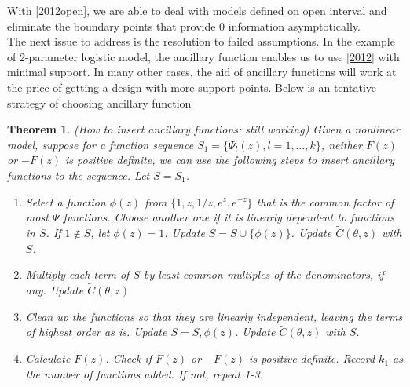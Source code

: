 \documentclass[11pt]{amsart}
\newtheorem{theorem}{Theorem}[section]
\theoremstyle{definition}
\theoremstyle{remark}
\begin{document}
With \ref{2012open}, we are able to deal with models defined on open interval and eliminate the boundary points that provide 0 information asymptotically. \\

The next issue to address is the resolution to failed assumptions. In the example of 2-parameter logistic model, the ancillary function enables us to use \ref{2012} with minimal support. In many other cases, the aid of ancillary functions will work at the price of getting a design with more support points. Below is an tentative strategy of choosing ancillary function  %


\begin{theorem}\label{proc}(How to insert ancillary functions: still working)
Given a nonlinear model, suppose for a function sequence $S_1 = \{\Psi_l(z), l = 1,\ldots,k\}$, neither $F(z)$ or $-F(z)$ is positive definite, we can use the following steps to insert ancillary functions to the sequence. Let $S = S_1$.
\begin{enumerate}
    \item Select a function $\phi(z)$ from $\{1, z, 1/z, e^z,e^{-z}\}$ that is the common factor of most $\Psi$ functions. Choose another one if it is linearly dependent to functions in $S$. If $1\not\in S$, let $\phi(z) = 1$. Update $S = S\cup\{\phi(z)\}$. Update $\tilde{C}(\theta,z)$ with $S$.
    \item Multiply each term of $S$ by least common multiples of the denominators, if any. Update $\tilde{C}(\theta,z)$ 
    
    \item Clean up the functions so that they are linearly independent, leaving the terms of highest order as is. Update $S = {S,\phi(z)}$. Update $\tilde{C}(\theta,z)$ with $S$.
     \item Calculate $\tilde{F}(z)$. Check if $\tilde{F}(z)$ or $-\tilde{F}(z)$ is positive definite. Record $k_1$ as the number of functions added. If not, repeat 1-3.
\end{enumerate}
\end{theorem}
\end{document}

